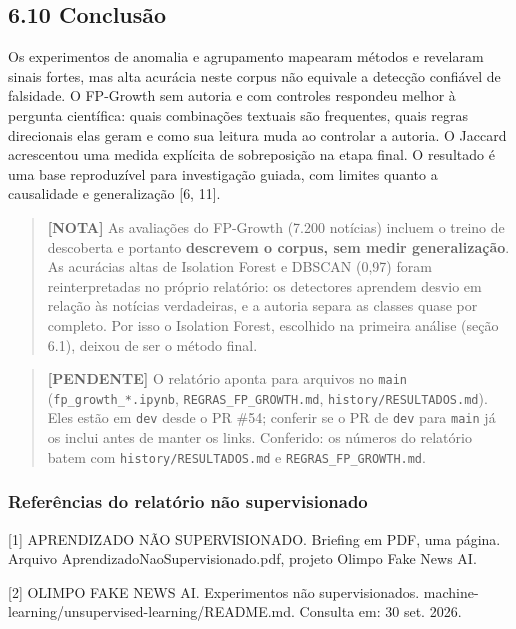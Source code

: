 \documentclass[
  brazilian,
  11pt,
]{article}
\begin{document}
\subsection{6.10 Conclusão}\label{conclusuxe3o}

Os experimentos de anomalia e agrupamento mapearam métodos e revelaram sinais fortes, mas alta acurácia neste corpus não equivale a detecção confiável de falsidade. O FP-Growth sem autoria e com controles respondeu melhor à pergunta científica: quais combinações textuais são frequentes, quais regras direcionais elas geram e como sua leitura muda ao controlar a autoria. O Jaccard acrescentou uma medida explícita de sobreposição na etapa final. O resultado é uma base reproduzível para investigação guiada, com limites quanto a causalidade e generalização {[}6, 11{]}.

\begin{quote}
\textbf{{[}NOTA{]}} As avaliações do FP-Growth (7.200 notícias) incluem o treino de descoberta e portanto \textbf{descrevem o corpus, sem medir generalização}. As acurácias altas de Isolation Forest e DBSCAN (0,97) foram reinterpretadas no próprio relatório: os detectores aprendem desvio em relação às notícias verdadeiras, e a autoria separa as classes quase por completo. Por isso o Isolation Forest, escolhido na primeira análise (seção 6.1), deixou de ser o método final.
\end{quote}

\begin{quote}
\textbf{{[}PENDENTE{]}} O relatório aponta para arquivos no \texttt{main} (\texttt{fp\_growth\_*.ipynb}, \texttt{REGRAS\_FP\_GROWTH.md}, \texttt{history/RESULTADOS.md}). Eles estão em \texttt{dev} desde o PR \#54; conferir se o PR de \texttt{dev} para \texttt{main} já os inclui antes de manter os links. Conferido: os números do relatório batem com \texttt{history/RESULTADOS.md} e \texttt{REGRAS\_FP\_GROWTH.md}.
\end{quote}

\subsubsection{Referências do relatório não supervisionado}\label{referuxeancias-do-relatuxf3rio-nuxe3o-supervisionado}

{[}1{]} APRENDIZADO NÃO SUPERVISIONADO. Briefing em PDF, uma página. Arquivo AprendizadoNaoSupervisionado.pdf, projeto Olimpo Fake News AI.

{[}2{]} OLIMPO FAKE NEWS AI. Experimentos não supervisionados. machine-learning/unsupervised-learning/README.md. Consulta em: 30 set. 2026.
\end{document}
